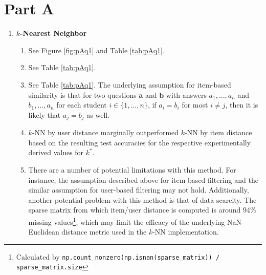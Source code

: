 \documentclass[10pt]{article}
\renewcommand{\bf}[1]{\mathbf{#1}}
\begin{document}
\thispagestyle{plain}

\maketitle

\vspace{0.5in}

\section*{Part A}

\begin{enumerate}
    \item \textbf{$k$-Nearest Neighbor}
    
    \begin{enumerate}[label = \textbf{\alph*}.]
        \item See Figure \ref{fig:pAq1} and Table \ref{tab:pAq1}.
        \item See Table \ref{tab:pAq1}.
        \item See Table \ref{tab:pAq1}. The underlying assumption for item-based similarity is that for two questions $\bf a$ and $\bf b$ with answers $a_1,\dots,a_n$ and $b_1,\dots,a_n$ for each student $i\in\{1,\dots,n\}$, if $a_i=b_i$ for most $i\neq j$, then it is likely that $a_j=b_j$ as well.
        \item $k$-NN by user distance marginally outperformed $k$-NN by item distance based on the resulting test accuracies for the respective experimentally derived values for $k^*$.
        \item There are a number of potential limitations with this method. For instance, the assumption described above for item-based filtering and the similar assumption for user-based filtering may not hold. Additionally, another potential problem with this method is that of data scarcity. The sparse matrix from which item/user distance is computed is around 94\% missing values\footnote{Calculated by \texttt{np.count\_nonzero(np.isnan(sparse\_matrix)) / sparse\_matrix.size}}, which may limit the efficacy of the underlying NaN-Euclidean distance metric used in the $k$-NN implementation.
    \end{enumerate}


\end{enumerate}
\end{document}
